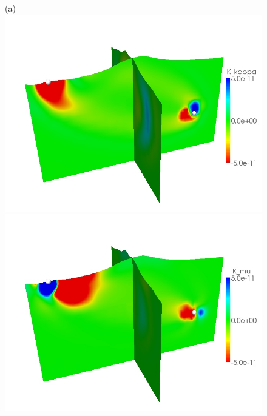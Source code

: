 \documentclass[referee,extra]{gji}
\begin{document}
\begin{figure}
\begin{center}
\begin{minipage}[t]{0.49\textwidth}
\begin{center}
(a)\\
\includegraphics[width=1.\textwidth]{./images/mount_kappa_kernel.jpg} \\
\includegraphics[width=1.\textwidth]{./images/mount_mu_kernel.jpg}\\

\end{center}
\end{minipage}
\end{center}
\end{figure}
\end{document}
